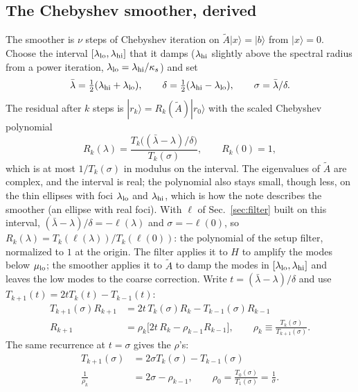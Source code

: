 \documentclass[11pt,a4paper]{article}
\numberwithin{equation}{section}
\begin{document}
\subsection{The Chebyshev smoother, derived}
The smoother is $\nu$ steps of Chebyshev iteration on $\tilde A|x\rangle=|b\rangle$ from $|x\rangle=0$. Choose the interval
$[\lambda_{\rm lo},\lambda_{\rm hi}]$ that it damps ($\lambda_{\rm hi}$ slightly above the spectral
radius from a power iteration, $\lambda_{\rm lo}=\lambda_{\rm hi}/\kappa_s$) and set
\begin{equation}
\bar\lambda=\tfrac12(\lambda_{\rm hi}+\lambda_{\rm lo}),\qquad
\delta=\tfrac12(\lambda_{\rm hi}-\lambda_{\rm lo}),\qquad \sigma=\bar\lambda/\delta .
\end{equation}
The residual after $k$ steps is $|r_k\rangle=R_k(\tilde A)|r_0\rangle$ with the scaled Chebyshev polynomial
\begin{equation}
R_k(\lambda)=\frac{T_k\big((\bar\lambda-\lambda)/\delta\big)}{T_k(\sigma)},\qquad R_k(0)=1,
\end{equation}
which is at most $1/T_k(\sigma)$ in modulus on the interval. The eigenvalues of $\tilde A$ are
complex, and the interval is real; the polynomial also stays small, though less, on the thin
ellipses with foci $\lambda_{\rm lo}$ and $\lambda_{\rm hi}$, which is how the note describes the
smoother (an ellipse with real foci). With $\ell$ of
Sec.~\ref{sec:filter} built on this interval, $(\bar\lambda-\lambda)/\delta=-\ell(\lambda)$ and
$\sigma=-\ell(0)$, so $R_k(\lambda)=T_k(\ell(\lambda))/T_k(\ell(0))$: the polynomial of the setup
filter, normalized to $1$ at the origin. The filter applies it to $H$ to amplify the modes below
$\mu_{\rm lo}$; the smoother applies it to $\tilde A$ to damp the modes in
$[\lambda_{\rm lo},\lambda_{\rm hi}]$ and leaves the low modes to the coarse correction. Write $t=(\bar\lambda-\lambda)/\delta$ and
use $T_{k+1}(t)=2tT_k(t)-T_{k-1}(t)$:
\begin{align}
T_{k+1}(\sigma)R_{k+1}&=2t\,T_k(\sigma)R_k-T_{k-1}(\sigma)R_{k-1}\nonumber\\
R_{k+1}&=\rho_k\big[2t\,R_k-\rho_{k-1}R_{k-1}\big],\qquad \rho_k\equiv\frac{T_k(\sigma)}{T_{k+1}(\sigma)} .
\end{align}
The same recurrence at $t=\sigma$ gives the $\rho$'s:
\begin{align}
T_{k+1}(\sigma)&=2\sigma T_k(\sigma)-T_{k-1}(\sigma)\nonumber\\
\frac1{\rho_k}&=2\sigma-\rho_{k-1},\qquad \rho_0=\frac{T_0(\sigma)}{T_1(\sigma)}=\frac1\sigma .
\end{align}
\end{document}
